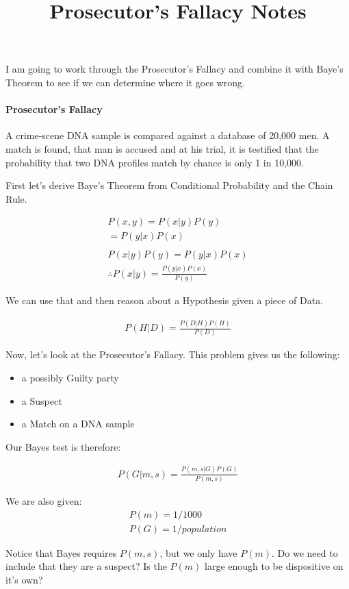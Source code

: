\documentclass{article}
\begin{document}
\title{Prosecutor's Fallacy Notes}

I am going to work through the Prosecutor's Fallacy and combine it with Baye's Theorem to see if we can determine where it goes wrong.

\paragraph{Prosecutor's Fallacy}
A crime-scene DNA sample is compared against a database of
20,000 men. A match is found, that man is accused and at his trial, it is testified that
the probability that two DNA profiles match by chance is only 1 in 10,000.

First let's derive Baye's Theorem from Conditional Probability and the Chain Rule.

\begin{align}
P(x,y) = P(x|y)P(y)\\
       = P(y|x)P(x)\\ \\
P(x|y)P(y) = P(y|x)P(x)\\
\therefore 
P(x|y) = \frac{P(y|x)P(x)}{P(y)}
\end{align}

We can use that and then reason about a Hypothesis given a piece of Data.

\begin{align}
	P(H|D) = \frac{P(D|H)P(H)}{P(D)}
\end{align}

Now, let's look at the Prosecutor's Fallacy. This problem gives us the following:

\begin{itemize}
	\item a possibly Guilty party
	\item a Suspect
	\item a Match on a DNA sample
\end{itemize}


Our Bayes test is therefore:

\begin{align}
	P(G|m,s) = \frac{P(m,s|G)P(G)}{P(m,s)}
\end{align}

We are also given:
\begin{align}
	P(m) = 1/1000 \\
	P(G) = 1/population
\end{align}

Notice that Bayes requires $P(m,s)$, but we only have $P(m)$. Do we need to include that they are a suspect? Is the $P(m)$ large enough to be dispositive on it's own?
\end{document}
